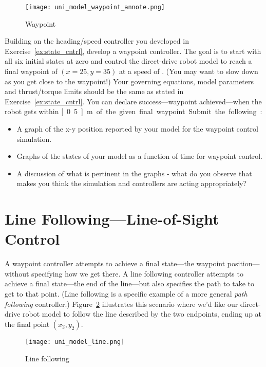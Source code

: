 \begin{figure}[hbt]
\centering
\texttt{[image: uni\_model\_waypoint\_annote.png]}
\caption{Waypoint}
\label{f:waypoint_annote}
\end{figure}

\begin{ex}
Building on the heading/speed controller you developed in Exercise~\ref{ex:state_cntrl}, develop a waypoint controller.  The goal is to start with all six initial states at zero and control the direct-drive robot model to reach a final waypoint of $(x=25,y=35)$ at a speed of .  (You may want to slow down as you get close to the waypoint!)  Your governing equations, model parameters and thrust/torque limits should be the same as stated in Exercise~\ref{ex:state_cntrl}.  You can declare success---waypoint achieved---when the robot gets within \unit[0.5]{m} of the given final waypoint.

Submit the following:
\begin{itemize}
\item A graph of the x-y position reported by your model for the waypoint control simulation.
\item Graphs of the states of your model as a function of time for waypoint control.
\item A discussion of what is pertinent in the graphs - what do you observe that makes you think the simulation and controllers are acting appropriately?
\end{itemize}
\end{ex}


\section{Line Following---Line-of-Sight Control}
A waypoint controller attempts to achieve a final state---the waypoint position---without specifying how we get there.  A line following controller attempts to achieve a final state---the end of the line---but also specifies the path to take to get to that point.  (Line following is a specific example of a more general \emph{path following} controller.)  Figure~\ref{f:line} illustrates this scenario where we'd like our direct-drive robot model to follow the line described by the two endpoints, ending up at the final point $(x_2,y_2)$.

\begin{figure}[hbt]
\centering
\texttt{[image: uni\_model\_line.png]}
\caption{Line following}
\label{f:line}
\end{figure}

